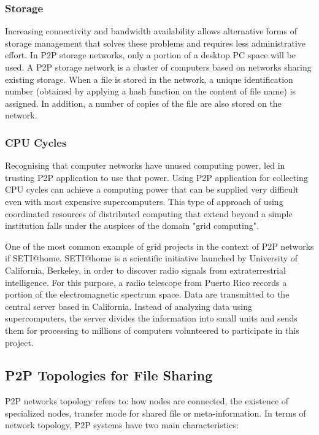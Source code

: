 \subsubsection{Storage}

Increasing connectivity and bandwidth availability allows alternative forms of
storage management that solves these problems and requires less administrative
effort. In P2P storage networks, only a portion of a desktop PC space will be
used. A P2P storage network is a cluster of computers based on networks sharing
existing storage. When a file is stored in the network, a unique identification
number (obtained by applying a hash function on the content of file name) is
assigned. In addition, a number of copies of the file are also stored on the
network.

\subsubsection{CPU Cycles}

Recognising that computer networks have unused computing power, led in trusting
P2P application to use that power. Using P2P application for collecting CPU
cycles can achieve a computing power that can be supplied very difficult even
with most expensive supercomputers. This type of approach of using coordinated
resources of distributed computing that extend beyond a simple institution
falls under the auspices of the domain "grid computing".

One of the most common example of grid projects in the context of P2P networks
if SETI@home. SETI@home is a scientific initiative launched by University of
California, Berkeley, in order to discover radio signals from extraterrestrial
intelligence. For this purpose, a radio telescope from Puerto Rico records a
portion of the electromagnetic spectrum space. Data are transmitted to the
central server based in California. Instead of analyzing data using
supercomputers, the server divides the information into small units and sends
them for processing to millions of computers volunteered to participate in this
project.

\subsection{P2P Topologies for File Sharing}

P2P networks topology refers to: how nodes are connected, the existence of
specialized nodes, transfer mode for shared file or meta-information. In terms
of network topology, P2P systems have two main characteristics:

